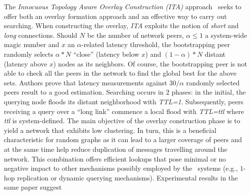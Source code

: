 The \emph{Innocuous Topology Aware Overlay Construction (ITA)}
approach~\cite{PRFM2013} seeks to offer both an overlay formation approach and
an effective way to carry out searching. When constructing the overlay,
\emph{ITA} exploits the notion of \emph{short} and \emph{long} connections.
Should $N$ be the number of network peers,  $\alpha \leq 1 $ a system-wide magic
number and $x$ an $\alpha$-related latency threshold, the bootstrapping peer
randomly selects $\alpha \ast N$ ``close'' (latency below $x$) and 
$\left( 1 - \alpha \right) \ast N$ distant (latency above $x$) nodes
as its neighbors. Of course, the bootstrapping peer is not able to check all the
peers in the network to find the global best for the above sets. Authors
prove that latency measurements against $30/ \alpha$ randomly selected peers
result to a good estimation. 
Searching occurs in $2$ phases: in the initial, the querying node
floods its distant neighborhood  with \emph{TTL=1}.
Subsequently, peers receiving a query over a ``long link'' commence a 
local flood with \emph{TTL=ttl} where \emph{ttl} is system-defined.
The main objective of the overlay construction phase is to yield a network that
exhibits low clustering. In turn, this is a beneficial characteristic for
random graphs as it can lead to a larger coverage of peers and at the same time
help reduce duplication of messages travelling around the network. This
combination offers efficient lookups that pose minimal or no negative impact to
other mechanisms possibly employed by the \p\ systems (e.g., $1$-hop replication
or dynamic querying mechanisms). Experimental results in the same paper suggest
